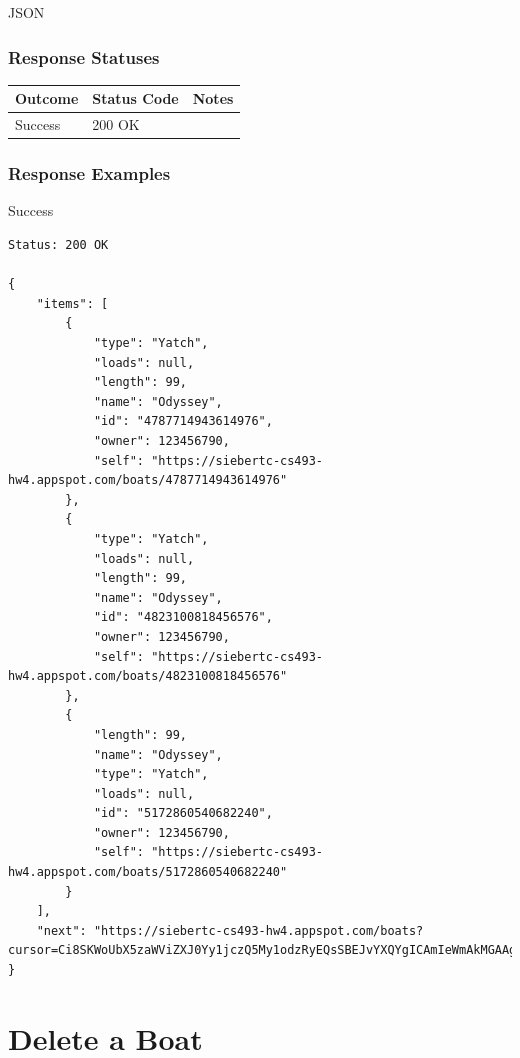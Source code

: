 \documentclass[letterpaper,11pt,titlepage,draftclsnofoot,onecolumn,compsoc,utf8,latin1]{IEEEtran}
\begin{document}
\begin{singlespace}
JSON

\subsubsection{Response Statuses}

\begin{center}
\begin{tabular}{ |p{}|p{}|p{}| } 
 \hline
 \textbf{Outcome} & \textbf{Status Code} & \textbf{Notes}  \\  \hline
 Success & 200 OK &  \\
 \hline
\end{tabular}
\end{center}

\subsubsection{Response Examples}

\noindent \Large{Success}

\begin{lstlisting}[]
Status: 200 OK

{
    "items": [
        {
            "type": "Yatch",
            "loads": null,
            "length": 99,
            "name": "Odyssey",
            "id": "4787714943614976",
            "owner": 123456790,
            "self": "https://siebertc-cs493-hw4.appspot.com/boats/4787714943614976"
        },
        {
            "type": "Yatch",
            "loads": null,
            "length": 99,
            "name": "Odyssey",
            "id": "4823100818456576",
            "owner": 123456790,
            "self": "https://siebertc-cs493-hw4.appspot.com/boats/4823100818456576"
        },
        {
            "length": 99,
            "name": "Odyssey",
            "type": "Yatch",
            "loads": null,
            "id": "5172860540682240",
            "owner": 123456790,
            "self": "https://siebertc-cs493-hw4.appspot.com/boats/5172860540682240"
        }
    ],
    "next": "https://siebertc-cs493-hw4.appspot.com/boats?cursor=Ci8SKWoUbX5zaWViZXJ0Yy1jczQ5My1odzRyEQsSBEJvYXQYgICAmIeWmAkMGAAgAA=="
}
\end{lstlisting}

\newpage 

\normalsize

\section{Delete a Boat}


\end{singlespace}
\end{document}

